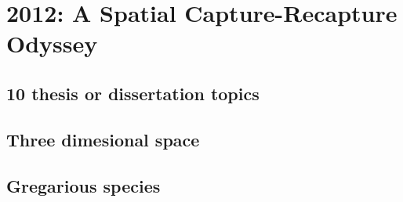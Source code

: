 


\chapter{
 2012: A Spatial Capture-Recapture Odyssey
 }

\label{chapt.final}


\section{10 thesis or dissertation topics}


\section{Three dimesional space}



\section{Gregarious species}
